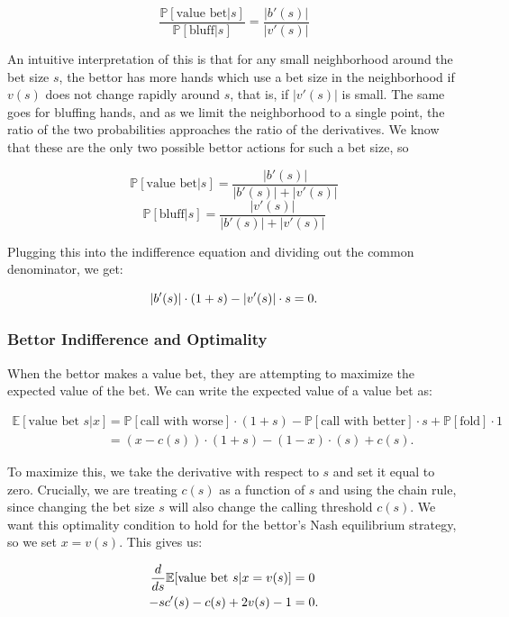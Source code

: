 \documentclass[../../main/main.tex]{subfiles}
\begin{document}
\[ \frac{\mathbb{P}[\text{value bet} | s]}{\mathbb{P}[\text{bluff} | s]} = \frac{|b'(s)|}{|v'(s)|}\]

An intuitive interpretation of this is that for any small neighborhood around the bet size $s$, the bettor has more hands which use a bet size in the neighborhood if $v(s)$ does not change rapidly around $s$, that is, if $|v'(s)|$ is small. The same goes for bluffing hands, and as we limit the neighborhood to a single point, the ratio of the two probabilities approaches the ratio of the derivatives. We know that these are the only two possible bettor actions for such a bet size, so

\[ \mathbb{P}[\text{value bet} | s] = \frac{|b'(s)|}{|b'(s)| + |v'(s)|} \]
\[ \mathbb{P}[\text{bluff} | s] = \frac{|v'(s)|}{|b'(s)| + |v'(s)|} \]

Plugging this into the indifference equation and dividing out the common denominator, we get:

\begin{equation}{\label{callindiff}}
    |b'(s)| \cdot (1 + s) - |v'(s)| \cdot s = 0.
\end{equation}



\subsubsection{Bettor Indifference and Optimality}

When the bettor makes a value bet, they are attempting to maximize the expected value of the bet. We can write the expected value of a value bet as:

\begin{align*}
    \mathbb{E}[\text{value bet } s | x] & = \mathbb{P}[\text{call with worse}] \cdot (1+s) - \mathbb{P}[\text{call with better}] \cdot s + \mathbb{P}[\text{fold}] \cdot 1 \\
    & = (x-c(s)) \cdot (1+s) - (1-x) \cdot (s) + c(s).
\end{align*}

To maximize this, we take the derivative with respect to $s$ and set it equal to zero. Crucially, we are treating $c(s)$ as a function of $s$ and using the chain rule, since changing the bet size $s$ will also change the calling threshold $c(s)$. We want this optimality condition to hold for the bettor's Nash equilibrium strategy, so we set $x=v(s)$. This gives us:

\begin{align}{\label{valueoptimality}}
    \nonumber \frac{d}{ds} \mathbb{E}[\text{value bet } s | x=v(s)] & = 0 \\
    -sc'(s) - c(s) + 2 v(s) - 1 & = 0.
\end{align}
\end{document}
